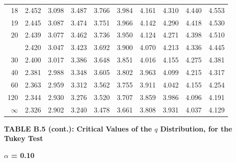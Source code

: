 \documentclass[10pt]{article}
\begin{document}
\begin{longtable}{@{}r!{\vrule width 0.8pt\hspace{0.55em}}rrrrrrrrr@{}}
18 & 2.452 & 3.098 & 3.487 & 3.766 & 3.984 & 4.161 & 4.310 & 4.440 & 4.553 \\
19 & 2.445 & 3.087 & 3.474 & 3.751 & 3.966 & 4.142 & 4.290 & 4.418 & 4.530 \\
20 & 2.439 & 3.077 & 3.462 & 3.736 & 3.950 & 4.124 & 4.271 & 4.398 & 4.510 \\
 & 2.420 & 3.047 & 3.423 & 3.692 & 3.900 & 4.070 & 4.213 & 4.336 & 4.445 \\
30 & 2.400 & 3.017 & 3.386 & 3.648 & 3.851 & 4.016 & 4.155 & 4.275 & 4.381 \\
40 & 2.381 & 2.988 & 3.348 & 3.605 & 3.802 & 3.963 & 4.099 & 4.215 & 4.317 \\
60 & 2.363 & 2.959 & 3.312 & 3.562 & 3.755 & 3.911 & 4.042 & 4.155 & 4.254 \\
120 & 2.344 & 2.930 & 3.276 & 3.520 & 3.707 & 3.859 & 3.986 & 4.096 & 4.191 \\
\addlinespace[0.30em]
$\infty$ & 2.326 & 2.902 & 3.240 & 3.478 & 3.661 & 3.808 & 3.931 & 4.037 & 4.129 \\
\end{longtable}
\newpage
\thispagestyle{empty}
\begin{center}
{\large\bfseries TABLE B.5 (cont.): Critical Values of the $q$ Distribution, for the Tukey Test\par}
\end{center}
{\large\bfseries $\alpha$ = 0.10\par}
\vspace{0.45em}
\small
\end{document}
